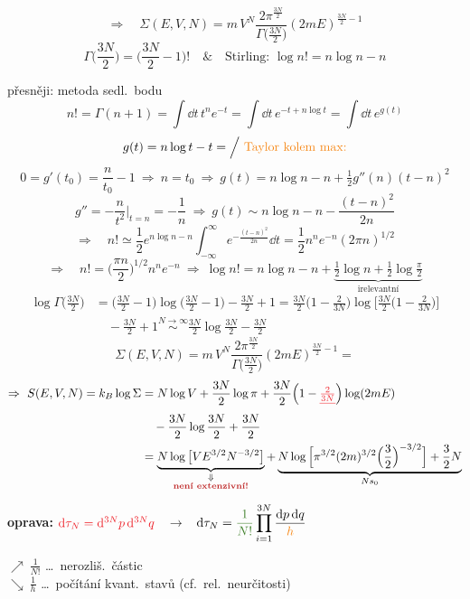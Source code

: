 {\color{NavyBlue}
\[
  \Rightarrow\quad \Sigma(E,V,N) = m\,V^N\frac{2\pi^{\frac{3N}{2}}}{\Gamma\big(\frac{3N}{2}\big)}(2mE)^{\frac{3N}{2}-1}
\]
\[
  \Gamma\Big(\frac{3N}{2}\Big) = \Big(\frac{3N}{2} - 1\Big)! \quad\&\quad \text{Stirling: } \log n! = n\log n - n
\]

přesněji: metoda sedl.\ bodu
\[
  n! = \Gamma(n+1) = \int\dd t\,t^ne^{-t} = \int\dd t\,e^{-t+n\log t} = \int\dd t\,e^{g(t)}
\]
\[
  g(t) = n\log t - t = \Big/\ \textcolor{BurntOrange}{\text{Taylor kolem max:}}
\]
{\color{BurntOrange}
\[
  0 = g'(t_0) = \frac{n}{t_0} - 1 \ \Rightarrow\ n = t_0 \ \Rightarrow\ g(t) = n\log n - n + \tfrac12g''(n)(t-n)^2
\]
\[
  g'' = -\frac{n}{t^2}\Big|_{t=n} = -\frac1n \ \Rightarrow\ g(t) \sim n\log n - n - \frac{(t-n)^2}{2n}
\]
}
\[
  \Rightarrow\quad n! \simeq \frac12e^{n\log n - n}\int_{-\infty}^{\infty}e^{-\frac{(t-n)^2}{2n}}\dd t = \frac12n^ne^{-n}(2\pi n)^{1/2}
\]
\[
  \Rightarrow\quad n! = \Big(\frac{\pi n}{2}\Big)^{1/2}n^ne^{-n} \ \Rightarrow\
  \log n! = n\log n - n + \underbrace{\tfrac12\log n + \tfrac12\log\tfrac{\pi}{2}}_{\text{irelevantní}}
\]
\begin{align*}
  \log\Gamma\Big(\frac{3N}{2}\Big) &= \Big(\frac{3N}{2} - 1\Big)\log\Big(\frac{3N}{2} - 1\Big) - \frac{3N}{2} + 1
  = \frac{3N}{2}\Big(1 - \frac{2}{3N}\Big)\log\Big[\frac{3N}{2}\Big(1 - \frac{2}{3N}\Big)\Big] \\
  &\quad - \frac{3N}{2} + 1 \overset{N\to\infty}{\sim} \frac{3N}{2}\log\frac{3N}{2} - \frac{3N}{2}
\end{align*}
\[
  \Sigma(E,V,N) = m\,V^N\frac{2\pi^{\frac{3N}{2}}}{\Gamma\big(\frac{3N}{2}\big)}(2mE)^{\frac{3N}{2}-1} =
\]
\begin{align*}
  \Rightarrow\ S(E,V,N) = k_B\log\Sigma &= N\log V + \frac{3N}{2}\log\pi + \frac{3N}{2}\Big(1 - \textcolor{Red}{\sout{\tfrac{2}{3N}}}\Big)\log(2mE) \\
  &\quad - \frac{3N}{2}\log\frac{3N}{2} + \frac{3N}{2} \\
  &= \underbrace{N\log\big[VE^{3/2}N^{-3/2}\big]}_{\substack{\Downarrow\\ \text{\pozor{není extenzivní!}}}}
   + \underbrace{N\log\Big[\pi^{3/2}(2m)^{3/2}\Big(\frac32\Big)^{-3/2}\Big] + \frac32N}_{Ns_0}
\end{align*}
}

\textcolor{NavyBlue}{\textbf{oprava:}} \quad
$\textcolor{Red}{\dd\tau_N = \dd^{3N}p\,\dd^{3N}q}$ \ $\to$ \
$\displaystyle\dd\tau_N = \textcolor{OliveGreen}{\frac{1}{N!}}\prod_{i=1}^{3N}\frac{\dd p\,\dd q}{\textcolor{BurntOrange}{h}}$
\quad
\begin{minipage}{5.2cm}\small
\textcolor{OliveGreen}{$\nearrow\ \frac{1}{N!}$ \dots\ nerozliš.\ částic} \\
\textcolor{BurntOrange}{$\searrow\ \frac1h$ \dots\ počítání kvant.\ stavů (cf.\ rel.\ neurčitosti)}
\end{minipage}

